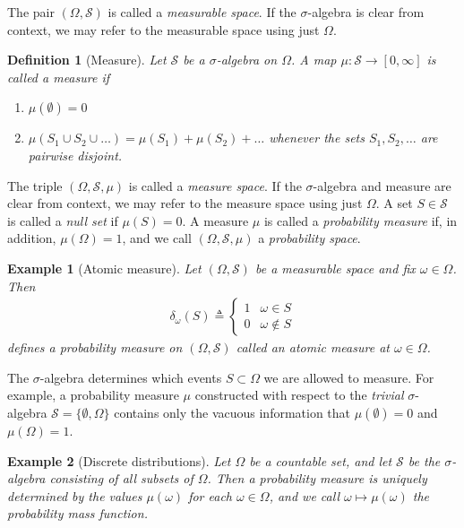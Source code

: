 \documentclass[12pt,paper=letter]{scrreprt}
\newtheorem{definition}{Definition}[chapter]
\newtheorem{example}{Example}[chapter]
\def\defeq{\triangleq} %
\begin{document}
\noindent The pair $(\Omega,\mathcal{S})$ is called a \emph{measurable space}.
If the $\sigma$-algebra is clear from context, we may refer to the measurable space using just $\Omega$.

\begin{definition}[Measure]
Let $\mathcal{S}$ be a $\sigma$-algebra on $\Omega$.
A map $\mu : \mathcal{S} \rightarrow [0,\infty]$ is called a \emph{measure} if
\begin{enumerate}
\item $\mu(\emptyset) = 0$
\item $\mu(S_1 \cup S_2 \cup \dots) = \mu(S_1) + \mu(S_2) + \dots$ whenever the sets $S_1,S_2,\dots$ are pairwise disjoint.
\end{enumerate}
\end{definition}

\noindent The triple $(\Omega,\mathcal{S},\mu)$ is called a \emph{measure space}.
If the $\sigma$-algebra and measure are clear from context, we may refer to the measure space using just $\Omega$.
A set $S \in \mathcal{S}$ is called a \emph{null set} if $\mu(S) = 0$.
A measure $\mu$ is called a \emph{probability measure} if, in addition, $\mu(\Omega) = 1$, and we call $(\Omega,\mathcal{S},\mu)$ a \emph{probability space}.

\begin{example}[Atomic measure]
    \label{ex: atomic measure}
    Let $(\Omega,\mathcal{S})$ be a measurable space and fix $\omega \in \Omega$.
    Then 
    \begin{align*}
        \delta_\omega(S) \defeq \left\{ \begin{array}{ll} 1 & \omega \in S \\ 0 & \omega \notin S \end{array} \right.
    \end{align*}
    defines a probability measure on $(\Omega,\mathcal{S})$ called an \emph{atomic measure} at $\omega \in \Omega$.
\end{example}

\noindent The $\sigma$-algebra determines which events $S \subset \Omega$ we are allowed to measure.
For example, a probability measure $\mu$ constructed with respect to the \emph{trivial} $\sigma$-algebra $\mathcal{S} = \{\emptyset,\Omega\}$ contains only the vacuous information that $\mu(\emptyset) = 0$ and $\mu(\Omega) = 1$.


\begin{example}[Discrete distributions]
\label{def: pmf}
Let $\Omega$ be a countable set, and let $\mathcal{S}$ be the $\sigma$-algebra consisting of all subsets of $\Omega$.
Then a probability measure is uniquely determined by the values $\mu(\omega)$ for each $\omega \in \Omega$, and we call $\omega \mapsto \mu(\omega)$ the \emph{probability mass function}.
\end{example}
\end{document}
